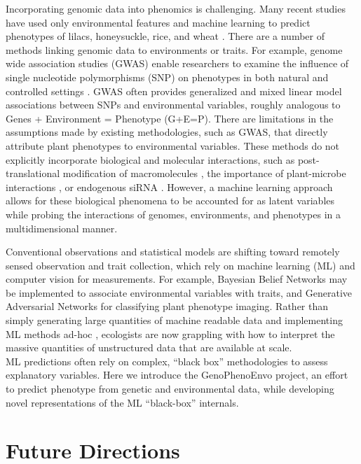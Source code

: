 \documentclass[12pt,]{article}
\begin{document}
Incorporating genomic data into phenomics is challenging. Many recent
studies have used only environmental features and machine learning to
predict phenotypes of lilacs, honeysuckle, rice, and wheat
\citep{ALDERMAN20171, nissanka2015calibration, mehdipoor2019geocomputational}.
There are a number of methods linking genomic data to environments or
traits. For example, genome wide association studies (GWAS) enable
researchers to examine the influence of single nucleotide polymorphisms
(SNP) on phenotypes in both natural and controlled settings
\citep{beyer2019loci, schlappi2017assessment, spindel2016genome}. GWAS
often provides generalized and mixed linear model associations between
SNPs and environmental variables, roughly analogous to Genes +
Environment = Phenotype (G+E=P). There are limitations in the
assumptions made by existing methodologies, such as GWAS, that directly
attribute plant phenotypes to environmental variables. These methods do
not explicitly incorporate biological and molecular interactions, such
as post-translational modification of macromolecules
\citep{running2014role}, the importance of plant-microbe interactions
\citep{oyserman2019extracting}, or endogenous siRNA
\citep{katiyar2006pathogen}. However, a machine learning approach allows
for these biological phenomena to be accounted for as latent variables
while probing the interactions of genomes, environments, and phenotypes
in a multidimensional manner.

Conventional observations and statistical models are shifting toward
remotely sensed observation and trait collection, which rely on machine
learning (ML) and computer vision for measurements. For example,
Bayesian Belief Networks \citep{cooper1990computational} may be
implemented to associate environmental variables with traits, and
Generative Adversarial Networks \citep{radford2015unsupervised} for
classifying plant phenotype imaging. Rather than simply generating large
quantities of machine readable data \citep{hampton2013big} and
implementing ML methods ad-hoc \citep{pichler2020machine}, ecologists
are now grappling with how to interpret the massive quantities of
unstructured data that are available at scale.\\
ML predictions often rely on complex, ``black box'' methodologies to
assess explanatory variables. Here we introduce the GenoPhenoEnvo
project, an effort to predict phenotype from genetic and environmental
data, while developing novel representations of the ML ``black-box''
internals.

\hypertarget{future-directions}{%
\section{Future Directions}\label{future-directions}}
\end{document}

